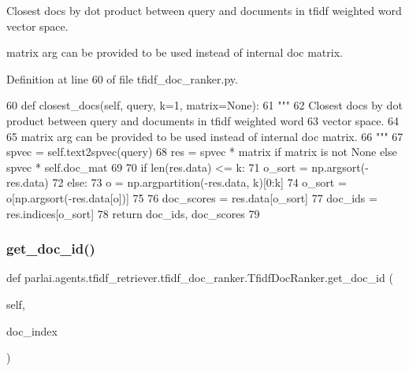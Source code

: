 \begin{DoxyVerb}Closest docs by dot product between query and documents in tfidf weighted word
vector space.

matrix arg can be provided to be used instead of internal doc matrix.
\end{DoxyVerb}
 

Definition at line 60 of file tfidf\+\_\+doc\+\_\+ranker.\+py.


\begin{DoxyCode}
60     \textcolor{keyword}{def }closest\_docs(self, query, k=1, matrix=None):
61         \textcolor{stringliteral}{"""}
62 \textcolor{stringliteral}{        Closest docs by dot product between query and documents in tfidf weighted word}
63 \textcolor{stringliteral}{        vector space.}
64 \textcolor{stringliteral}{}
65 \textcolor{stringliteral}{        matrix arg can be provided to be used instead of internal doc matrix.}
66 \textcolor{stringliteral}{        """}
67         spvec = self.text2spvec(query)
68         res = spvec * matrix \textcolor{keywordflow}{if} matrix \textcolor{keywordflow}{is} \textcolor{keywordflow}{not} \textcolor{keywordtype}{None} \textcolor{keywordflow}{else} spvec * self.doc\_mat
69 
70         \textcolor{keywordflow}{if} len(res.data) <= k:
71             o\_sort = np.argsort(-res.data)
72         \textcolor{keywordflow}{else}:
73             o = np.argpartition(-res.data, k)[0:k]
74             o\_sort = o[np.argsort(-res.data[o])]
75 
76         doc\_scores = res.data[o\_sort]
77         doc\_ids = res.indices[o\_sort]
78         \textcolor{keywordflow}{return} doc\_ids, doc\_scores
79 
\end{DoxyCode}
\mbox{\label{classparlai_1_1agents_1_1tfidf__retriever_1_1tfidf__doc__ranker_1_1TfidfDocRanker_a4ef2a607fd94e1ad9cf44239c8910378}} 
\subsubsection{\texorpdfstring{get\+\_\+doc\+\_\+id()}{get\_doc\_id()}}
{\footnotesize\ttfamily def parlai.\+agents.\+tfidf\+\_\+retriever.\+tfidf\+\_\+doc\+\_\+ranker.\+Tfidf\+Doc\+Ranker.\+get\+\_\+doc\+\_\+id (\begin{DoxyParamCaption}\item[{}]{self,  }\item[{}]{doc\+\_\+index }\end{DoxyParamCaption})}

